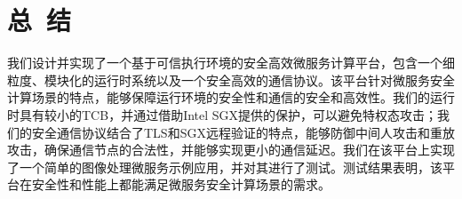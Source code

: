 \section{总\ 结}\label{sec:conclusion}

我们设计并实现了一个基于可信执行环境的安全高效微服务计算平台，包含一个细粒度、模块化的运行时系统以及一个安全高效的通信协议。该平台针对微服务安全计算场景的特点，能够保障运行环境的安全性和通信的安全和高效性。我们的运行时具有较小的TCB，并通过借助Intel SGX提供的保护，可以避免特权态攻击；我们的安全通信协议结合了TLS和SGX远程验证的特点，能够防御中间人攻击和重放攻击，确保通信节点的合法性，并能够实现更小的通信延迟。我们在该平台上实现了一个简单的图像处理微服务示例应用，并对其进行了测试。测试结果表明，该平台在安全性和性能上都能满足微服务安全计算场景的需求。
